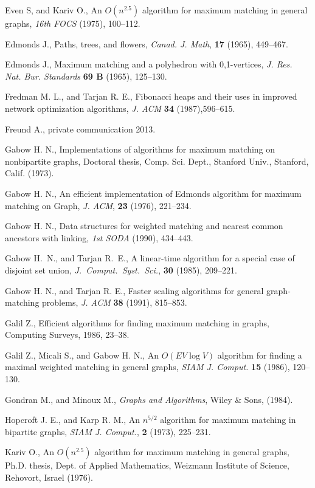 \documentclass[12pt,twoside,a4paper]{article}
\begin{document}
\begin{thebibliography}{99}
 Even S, and Kariv O.,
An $O(n^{2.5})$ algorithm for maximum matching in general graphs,
{\em 16th FOCS\/} (1975), 100--112.

 Edmonds J.,
Paths, trees, and flowers, {\em Canad. J. Math\/}, {\bf 17} (1965), 449--467.

 Edmonds J.,
Maximum matching and a polyhedron with 0,1-vertices, {\em J. Res. Nat. Bur.
Standards\/} {\bf 69 B} (1965), 125--130.

 Fredman M. L., and Tarjan R. E.,
Fibonacci heaps and their uses in improved network optimization algorithms,
{\em J. ACM\/} {\bf 34} (1987),596--615.

 Freund A., private communication 2013.

 Gabow H. N.,
Implementations of algorithms for maximum matching on nonbipartite graphs,
Doctoral thesis, Comp. Sci. Dept., Stanford Univ., Stanford, Calif.
(1973).

 Gabow H. N.,
An efficient implementation of Edmonds algorithm for maximum matching
on Graph, {\em J. ACM\/}, {\bf 23} (1976), 221--234.

 Gabow H. N.,
Data structures for weighted matching and nearest common ancestors with
linking, {\em 1st SODA\/} (1990), 434--443.

 Gabow H.~N., and Tarjan R.~E., 
A linear-time algorithm for a special case of disjoint set union, 
{\em J.~Comput.~Syst.~Sci.\/}, {\bf 30} (1985), 209--221.


 Gabow H. N., and Tarjan R. E.,
Faster scaling algorithms for general graph-matching problems, {\em J. ACM\/}
{\bf 38} (1991), 815--853.

 Galil Z., Efficient algorithms for finding maximum matching in graphs,
Computing Surveys, 1986, 23--38.

 Galil Z., Micali S., and Gabow H. N., An $O(EV \log V)$ algorithm for
finding a maximal weighted matching in general graphs, {\em SIAM J. Comput.\/} {\bf 15}
(1986), 120--130.

 Gondran M., and Minoux M.,
{\em Graphs and Algorithms}, Wiley \& Sons, (1984).

 Hopcroft J. E., and Karp R. M.,
An $n^{5/2}$ algorithm for maximum matching in bipartite graphs,
{\em SIAM J. Comput.\/}, {\bf 2} (1973), 225--231.

 Kariv O.,
An $O(n^{2.5})$ algorithm for maximum matching in general graphs,
Ph.D. thesis, Dept. of Applied Mathematics, Weizmann Institute of Science,
Rehovort, Israel (1976).


\end{thebibliography}
\end{document}
